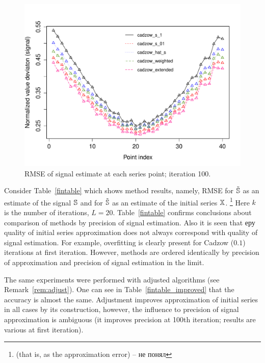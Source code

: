 \documentclass[12pt,a4paper,fleqn,leqno]{article}
\begin{document}
\begin{figure}[!hhh]
\begin{center}
\includegraphics[width = 13cm]{s1_it100.pdf}
\caption{RMSE of signal estimate at each series point; iteration 100.}
\label{fig:s1_it100}
\end{center}
\end{figure}

Consider Table~\ref{fintable} which shows method results, namely, RMSE for $\tilde {\mathbb{S}}$ as an estimate of the signal $\mathbb{S}$ and for $\tilde {\mathbb{S}}$ as an estimate of the initial series $\mathbb{X}$. \footnote{(that is, as the approximation error) -- не понял} Here $k$ is the number of iterations, $L=20$. Table~\ref{fintable} confirms conclusions about comparison of methods by precision of signal estimation. Also it is seen that еру quality of initial series approximation does not always correspond with quality of signal estimation. For example, overfitting is clearly present for Cadzow ($0.1$) iterations at first iteration. However, methods are ordered identically by precision of approximation and precision of signal estimation in the limit.

The same experiments were performed with adjusted algorithms (see Remark~\ref{rem:adjust}). One can see in Table~\ref{fintable_improved} that the accuracy is almost the same. Adjustment improves approximation of initial series in all cases by its construction, however, the influence to precision of signal approximation is ambiguous (it improves precision at 100th iteration; results are various at first iteration).
\end{document}
